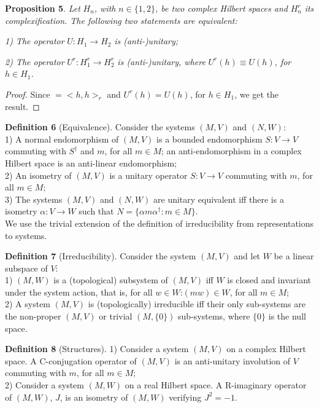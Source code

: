 \documentclass[11pt]{book}
\begin{document}
\textbf{Proposition 5}. \emph{Let }\(H_n\)\emph{, with
}\(n\in\{1,2\}\)\emph{, be two complex Hilbert spaces and
}\(H^r_n\)\emph{ its complexification. The following two statements are
equivalent:}

\emph{1) The operator }\(U:H_1\to H_2\)\emph{ is (anti-)unitary;}

\emph{2) The operator }\(U^r:H_1^r\to H_2^r\)\emph{ is (anti-)unitary,
where }\(U^r(h)\equiv U(h)\)\emph{, for }\(h\in H_1\)\emph{.}

\emph{Proof.} Since \(<h,h>=<h,h>_r\) and \(U^r(h)=U(h)\), for
\(h\in H_1\), we get the result.~◻

\textbf{Definition 6} (Equivalence). Consider the systems \((M,V)\) and
\((N,W)\):\\
1) A normal endomorphism of \((M,V)\) is a bounded endomorphism
\(S:V\to V\) commuting with \(S^\dagger\) and \(m\), for all \(m\in M\);
an anti-endomorphism in a complex Hilbert space is an anti-linear
endomorphism;\\
2) An isometry of \((M,V)\) is a unitary operator \(S:V\to V\) commuting
with \(m\), for all \(m\in M\);\\
3) The systems \((M,V)\) and \((N,W)\) are unitary equivalent iff there
is a isometry \(\alpha:V\to W\) such that
\(N=\{\alpha m\alpha^{\dagger}: m\in M\}\).\\

We use the trivial extension of the definition of irreducibility from
representations to systems.

\textbf{Definition 7} (Irreducibility). Consider the system \((M,V)\)
and let \(W\) be a linear subspace of \(V\):\\
1) \((M,W)\) is a (topological) subsystem of \((M,V)\) iff \(W\) is
closed and invariant under the system action, that is, for all
\(w\in W\):\((m w)\in W\), for all \(m\in M\);\\
2) A system \((M,V)\) is (topologically) irreducible iff their only
sub-systems are the non-proper \((M,V)\) or trivial \((M,\{0\})\)
sub-systems, where \(\{0\}\) is the null space.

\textbf{Definition 8} (Structures). 1) Consider a system \((M,V)\) on a
complex Hilbert space. A C-conjugation operator of \((M,V)\) is an
anti-unitary involution of \(V\) commuting with \(m\), for all
\(m\in M\);\\
2) Consider a system \((M,W)\) on a real Hilbert space. A R-imaginary
operator of \((M,W)\), \(J\), is an isometry of \((M,W)\) verifying
\(J^2=-1\).
\end{document}
